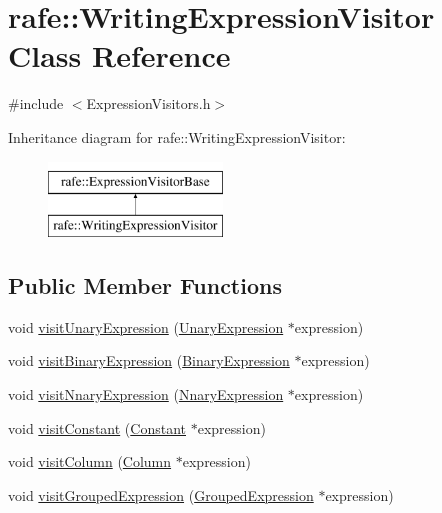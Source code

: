 \hypertarget{classrafe_1_1_writing_expression_visitor}{\section{rafe\+:\+:Writing\+Expression\+Visitor Class Reference}
\label{classrafe_1_1_writing_expression_visitor}
}


{\ttfamily \#include $<$Expression\+Visitors.\+h$>$}

Inheritance diagram for rafe\+:\+:Writing\+Expression\+Visitor\+:\begin{figure}[H]
\begin{center}
\leavevmode
\includegraphics[height=2.000000cm]{classrafe_1_1_writing_expression_visitor}
\end{center}
\end{figure}
\subsection*{Public Member Functions}
\begin{DoxyCompactItemize}
\item 
void \hyperlink{classrafe_1_1_writing_expression_visitor_af95c4c680abc9663fbc5ca7e0e419723}{visit\+Unary\+Expression} (\hyperlink{classrafe_1_1_unary_expression}{Unary\+Expression} $\ast$expression)
\item 
void \hyperlink{classrafe_1_1_writing_expression_visitor_ab4cb67967bc57450d891a87bcebde472}{visit\+Binary\+Expression} (\hyperlink{classrafe_1_1_binary_expression}{Binary\+Expression} $\ast$expression)
\item 
void \hyperlink{classrafe_1_1_writing_expression_visitor_a7b7d99dfe5f882b1282b451909838929}{visit\+Nnary\+Expression} (\hyperlink{classrafe_1_1_nnary_expression}{Nnary\+Expression} $\ast$expression)
\item 
void \hyperlink{classrafe_1_1_writing_expression_visitor_a30b82d54f29dc7a1ffc4ba67581dc680}{visit\+Constant} (\hyperlink{classrafe_1_1_constant}{Constant} $\ast$expression)
\item 
void \hyperlink{classrafe_1_1_writing_expression_visitor_a29f80e3c4267e05e49e48f44abd8cc94}{visit\+Column} (\hyperlink{classrafe_1_1_column}{Column} $\ast$expression)
\item 
void \hyperlink{classrafe_1_1_writing_expression_visitor_a4e57643ee4d25bc3a75e8a045524329d}{visit\+Grouped\+Expression} (\hyperlink{classrafe_1_1_grouped_expression}{Grouped\+Expression} $\ast$expression)
\end{DoxyCompactItemize}
